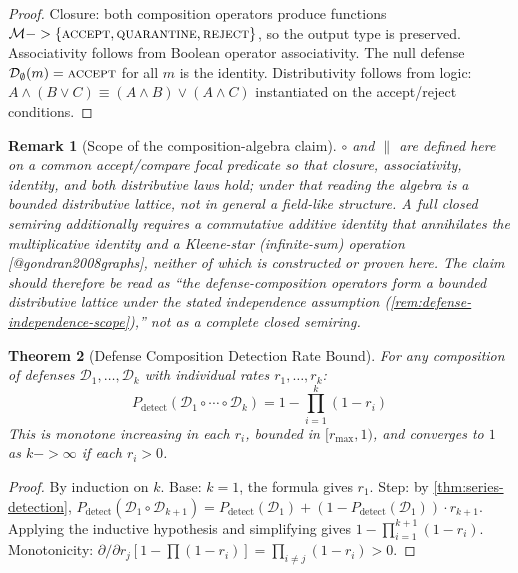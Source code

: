 \documentclass[
]{article}
\newtheorem{theorem}{Theorem}[section]
\newtheorem{remark}[theorem]{Remark}
\begin{document}
\begin{proof}
Closure: both composition operators produce functions $\mathcal{M} -> \{\textsc{accept}, \textsc{quarantine}, \textsc{reject}\}$, so the output type is preserved. Associativity follows from Boolean operator associativity. The null defense $\mathcal{D}_\emptyset(m) = \textsc{accept}$ for all $m$ is the identity. Distributivity follows from logic: $A \land (B \lor C) \equiv (A \land B) \lor (A \land C)$ instantiated on the accept/reject conditions.
\end{proof}

\begin{remark}[Scope of the composition-algebra claim]
\label{rem:composition-algebra-scope}
$\circ$ and $\parallel$ are defined here on a common accept/compare focal predicate so that closure, associativity, identity, and both distributive laws hold; under that reading the algebra is a bounded distributive lattice, not in general a \emph{field}-like structure. A full \emph{closed semiring} additionally requires a commutative additive identity that annihilates the multiplicative identity and a Kleene-star (infinite-sum) operation [@gondran2008graphs], neither of which is constructed or proven here. The claim should therefore be read as ``the defense-composition operators form a bounded distributive lattice under the stated independence assumption (\cref{rem:defense-independence-scope}),'' not as a complete closed semiring.
\end{remark}

\begin{theorem}[Defense Composition Detection Rate Bound]
\label{thm:composition-bound}
For any composition of defenses $\mathcal{D}_1, \ldots, \mathcal{D}_k$ with individual rates $r_1, \ldots, r_k$:
\begin{equation}
\label{eq:composition-bound}
P_{\text{detect}}(\mathcal{D}_1 \circ \cdots \circ \mathcal{D}_k) = 1 - \prod_{i=1}^{k}(1 - r_i)
\end{equation}
This is monotone increasing in each $r_i$, bounded in $[r_{\max}, 1)$, and converges to $1$ as $k -> \infty$ if each $r_i > 0$.
\end{theorem}

\begin{proof}
By induction on $k$. Base: $k=1$, the formula gives $r_1$. Step: by \cref{thm:series-detection}, $P_{\text{detect}}(\mathcal{D}_1 \circ \mathcal{D}_{k+1}) = P_{\text{detect}}(\mathcal{D}_1) + (1 - P_{\text{detect}}(\mathcal{D}_1)) \cdot r_{k+1}$. Applying the inductive hypothesis and simplifying gives $1 - \prod_{i=1}^{k+1}(1-r_i)$. Monotonicity: $\partial/\partial r_j [1 - \prod(1-r_i)] = \prod_{i \neq j}(1-r_i) > 0$.
\end{proof}
\end{document}
